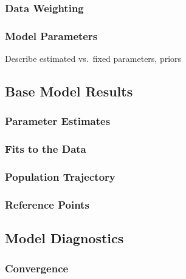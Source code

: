 \documentclass[11pt,
  english,
  letterpaper,
]{article}
\begin{document}
\hypertarget{data-weighting}{%
\subsubsection{Data Weighting}\label{data-weighting}}

\hypertarget{model-parameters}{%
\subsubsection{Model Parameters}\label{model-parameters}}

Describe estimated vs.~fixed parameters, priors

\hypertarget{base-model-results}{%
\subsection{Base Model Results}\label{base-model-results}}

\hypertarget{parameter-estimates}{%
\subsubsection{Parameter Estimates}\label{parameter-estimates}}

\hypertarget{fits-to-the-data}{%
\subsubsection{Fits to the Data}\label{fits-to-the-data}}

\hypertarget{population-trajectory}{%
\subsubsection{Population Trajectory}\label{population-trajectory}}

\hypertarget{reference-points-1}{%
\subsubsection{Reference Points}\label{reference-points-1}}

\hypertarget{model-diagnostics}{%
\subsection{Model Diagnostics}\label{model-diagnostics}}

\hypertarget{convergence}{%
\subsubsection{Convergence}\label{convergence}}
\end{document}
